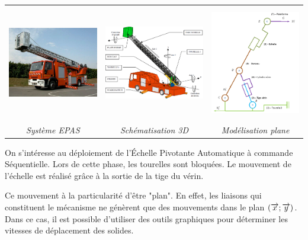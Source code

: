 \documentclass[10pt]{article}
\begin{document}

\begin{center}
\begin{tabular}{ccc}
\includegraphics[height=3.5cm]{images/fig1} &
\includegraphics[height=3.5cm]{images/fig2} &
\includegraphics[height=5cm]{images/fig4} \\
\textit{Système EPAS} & \textit{Schématisation 3D}&\textit{Modélisation plane}\\
\end{tabular}
\end{center}

\vspace{.2cm}

On s'intéresse au déploiement de l'Échelle Pivotante Automatique à commande Séquentielle. Lors de cette phase, les tourelles sont bloquées. Le mouvement de l'échelle est réalisé grâce à la sortie de la tige du vérin. 

Ce mouvement à la particularité d'être "plan". En effet, les liaisons qui constituent le mécanisme ne génèrent que des mouvements dans le plan $\left( \overrightarrow{x}; \overrightarrow{y}\right)$. Dans ce cas, il est possible d'utiliser des outils graphiques pour déterminer les vitesses de déplacement des solides. 
\end{document}
